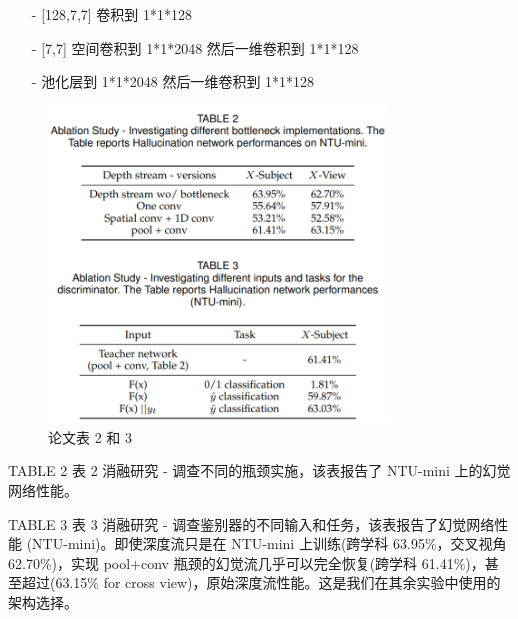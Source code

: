 \begin{itemize}

\item [-][128,7,7] 卷积到 1*1*128

\item [-][7,7] 空间卷积到 1*1*2048 然后一维卷积到 1*1*128

\item [-]池化层到 1*1*2048 然后一维卷积到 1*1*128

\end{itemize}

\begin{figure}[htb]
\centering 
\includegraphics[width=0.80\textwidth]{img/c1m7.png} 
\caption{论文表 2 和 3}
\label{Test}
\end{figure}

TABLE 2 表 2
消融研究 - 调查不同的瓶颈实施，该表报告了 NTU-mini 上的幻觉网络性能。

TABLE 3 表 3
消融研究 - 调查鉴别器的不同输入和任务，该表报告了幻觉网络性能 (NTU-mini)。即使深度流只是在 NTU-mini 上训练(跨学科 63.95\%，交叉视角 62.70\%)，实现 pool+conv 瓶颈的幻觉流几乎可以完全恢复(跨学科 61.41\%)，甚至超过(63.15\% for cross view)，原始深度流性能。这是我们在其余实验中使用的架构选择。



